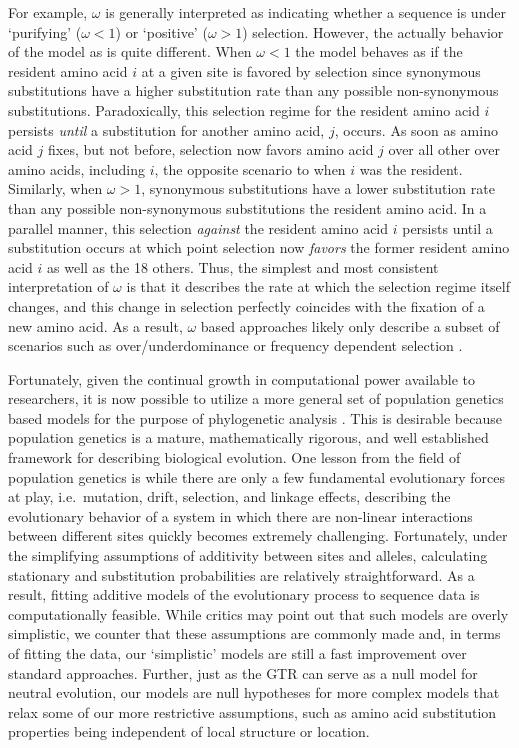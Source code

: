 \documentclass{article}
\begin{document}
For example,  $\omega$ is generally interpreted as indicating whether a sequence is under `purifying' ($\omega < 1$) or `positive' ($\omega > 1$) selection.
However, the actually behavior of the model as is quite different.
When $\omega < 1$ the model behaves as if the resident amino acid $i$ at a given site is favored by selection since synonymous substitutions have a higher substitution rate than any possible non-synonymous substitutions.
Paradoxically, this selection regime for the resident amino acid $i$ persists \emph{until} a substitution for another amino acid, $j$, occurs.
As soon as amino acid $j$ fixes, but not before, selection now favors amino acid $j$ over all other over amino acids, including $i$, the opposite scenario to when $i$ was the resident.
Similarly, when $\omega > 1$, synonymous substitutions have a lower substitution rate than any possible non-synonymous substitutions the resident amino acid.
In a parallel manner, this selection \emph{against} the resident amino acid $i$ persists until a substitution occurs at which point selection now \emph{favors}  the former resident amino acid $i$ as well as the 18 others.
Thus, the simplest and most consistent interpretation of $\omega$ is that it describes the rate at which the selection regime itself changes, and this change in selection perfectly coincides with the fixation of a new amino acid.
As a result, $\omega$ based approaches likely only describe a subset of scenarios such as over/underdominance or frequency dependent selection  \citep{HughesAndNei1988,Nowak2006}.

Fortunately, given the continual growth in computational power available to researchers, it is now possible to utilize a more general set of population genetics based models for the purpose of phylogenetic analysis \citep[e.g.][]{HalpernAndBruno1998,RobinsonEtAl2003,LartillotAndPhilippe2004,RodrigueAndLartillot2014}.
This is desirable because population genetics is a mature, mathematically rigorous, and well established framework for describing biological evolution.
One lesson from the field of population genetics is while there are only a few fundamental evolutionary forces at play, i.e.~mutation, drift, selection, and linkage effects, describing the evolutionary behavior of a system in which there are non-linear interactions between different sites quickly becomes extremely challenging.
Fortunately, under the simplifying assumptions of additivity between sites and alleles, calculating stationary and substitution probabilities are relatively straightforward.
As a result, fitting additive models of the evolutionary process to sequence data is computationally feasible.
While critics may point out that such models are overly simplistic, we counter that these assumptions are commonly made and, in terms of fitting the data, our `simplistic' models are still a fast improvement over standard approaches.
Further, just as the GTR can serve as a null model for neutral evolution, our models are null hypotheses for more complex models that relax some of our more restrictive assumptions, such as amino acid substitution properties being independent of local structure or location.
\end{document}
